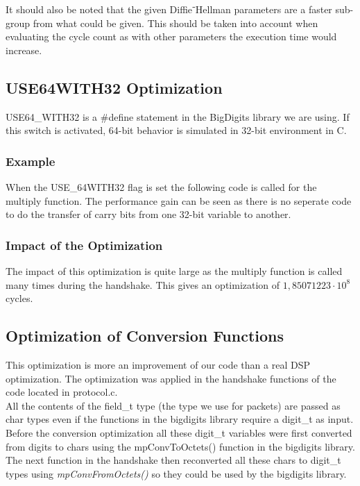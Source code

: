 \documentclass[a4paper]{article}
\begin{document}
It should also be noted that the given Diffie⁻Hellman parameters are a faster sub-group from what could be given. This should be taken into account when evaluating the cycle count as with other parameters the execution time would increase.\\

\subsection{USE64WITH32 Optimization}
USE64\_WITH32 is a $\#$define statement in the BigDigits library we are using. If this switch is activated, 64-bit behavior is simulated in 32-bit environment in C.

\subsubsection{Example}
When the USE\_64WITH32 flag is set the following code is called for the multiply function. The performance gain can be seen as there is no seperate code to do the transfer of carry bits from one 32-bit variable to another.



\subsubsection{Impact of the Optimization}
The impact of this optimization is quite large as the multiply function is called many times during the handshake. This gives an optimization of $1,85071223\cdot10^{8}$ cycles.

\subsection{Optimization of Conversion Functions}
This optimization is more an improvement of our code than a real DSP optimization. The optimization was applied in the handshake functions of the code located in protocol.c.\\

All the contents of the field\_t type (the type we use for packets) are passed as char types even if the functions in the bigdigits library require a digit\_t as input. Before the conversion optimization all these digit\_t variables were first converted from digits to chars using the mpConvToOctets() function in the bigdigits library. The next function in the handshake then reconverted all these chars to digit\_t types using \textit{mpConvFromOctets()} so they could be used by the bigdigits library.\\
\end{document}
